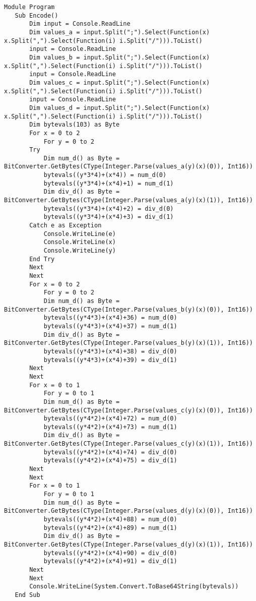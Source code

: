 \documentclass[11pt]{article}
\begin{document}
\begin{lstlisting}
Module Program
   Sub Encode()
       Dim input = Console.ReadLine
       Dim values_a = input.Split(";").Select(Function(x) x.Split(",").Select(Function(i) i.Split("/"))).ToList()
       input = Console.ReadLine
       Dim values_b = input.Split(";").Select(Function(x) x.Split(",").Select(Function(i) i.Split("/"))).ToList()
       input = Console.ReadLine
       Dim values_c = input.Split(";").Select(Function(x) x.Split(",").Select(Function(i) i.Split("/"))).ToList()
       input = Console.ReadLine
       Dim values_d = input.Split(";").Select(Function(x) x.Split(",").Select(Function(i) i.Split("/"))).ToList()
       Dim bytevals(103) as Byte
       For x = 0 to 2
       	   For y = 0 to 2
	   Try
	       Dim num_d() as Byte = BitConverter.GetBytes(CType(Integer.Parse(values_a(y)(x)(0)), Int16))
	       bytevals((y*3*4)+(x*4)) = num_d(0)
	       bytevals((y*3*4)+(x*4)+1) = num_d(1)
	       Dim div_d() as Byte = BitConverter.GetBytes(CType(Integer.Parse(values_a(y)(x)(1)), Int16))
	       bytevals((y*3*4)+(x*4)+2) = div_d(0)
	       bytevals((y*3*4)+(x*4)+3) = div_d(1)
	   Catch e as Exception
	       Console.WriteLine(e)
	       Console.WriteLine(x)
	       Console.WriteLine(y)
	   End Try
	   Next
       Next
       For x = 0 to 2
       	   For y = 0 to 2
	       Dim num_d() as Byte = BitConverter.GetBytes(CType(Integer.Parse(values_b(y)(x)(0)), Int16))
	       bytevals((y*4*3)+(x*4)+36) = num_d(0)
	       bytevals((y*4*3)+(x*4)+37) = num_d(1)
	       Dim div_d() as Byte = BitConverter.GetBytes(CType(Integer.Parse(values_b(y)(x)(1)), Int16))
	       bytevals((y*4*3)+(x*4)+38) = div_d(0)
	       bytevals((y*4*3)+(x*4)+39) = div_d(1)
	   Next
       Next
       For x = 0 to 1
       	   For y = 0 to 1
	       Dim num_d() as Byte = BitConverter.GetBytes(CType(Integer.Parse(values_c(y)(x)(0)), Int16))
	       bytevals((y*4*2)+(x*4)+72) = num_d(0)
	       bytevals((y*4*2)+(x*4)+73) = num_d(1)
	       Dim div_d() as Byte = BitConverter.GetBytes(CType(Integer.Parse(values_c(y)(x)(1)), Int16))
	       bytevals((y*4*2)+(x*4)+74) = div_d(0)
	       bytevals((y*4*2)+(x*4)+75) = div_d(1)
	   Next
       Next
       For x = 0 to 1
       	   For y = 0 to 1
	       Dim num_d() as Byte = BitConverter.GetBytes(CType(Integer.Parse(values_d(y)(x)(0)), Int16))
	       bytevals((y*4*2)+(x*4)+88) = num_d(0)
	       bytevals((y*4*2)+(x*4)+89) = num_d(1)
	       Dim div_d() as Byte = BitConverter.GetBytes(CType(Integer.Parse(values_d(y)(x)(1)), Int16))
	       bytevals((y*4*2)+(x*4)+90) = div_d(0)
	       bytevals((y*4*2)+(x*4)+91) = div_d(1)
	   Next
       Next
       Console.WriteLine(System.Convert.ToBase64String(bytevals))
   End Sub
   

\end{lstlisting}
\end{document}
